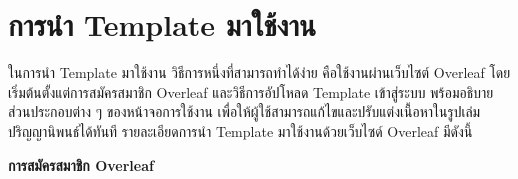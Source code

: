 \vspace{-0.5in}
\section{การนำ Template มาใช้งาน}
\hspace*{1.3em}
ในการนำ Template มาใช้งาน วิธีการหนึ่งที่สามารถทำได้ง่าย คือใช้งานผ่านเว็บไซต์ Overleaf โดยเริ่มต้นตั้งแต่การสมัครสมาชิก Overleaf และวิธีการอัปโหลด Template เข้าสู่ระบบ พร้อมอธิบายส่วนประกอบต่าง ๆ ของหน้าจอการใช้งาน เพื่อให้ผู้ใช้สามารถแก้ไขและปรับแต่งเนื้อหาในรูปเล่มปริญญานิพนธ์ได้ทันที รายละเอียดการนำ Template มาใช้งานด้วยเว็บไซด์ Overleaf มีดังนี้ 

\vspace{0.5em}
\textbf{การสมัครสมาชิก Overleaf}
\vspace{0.5em}

